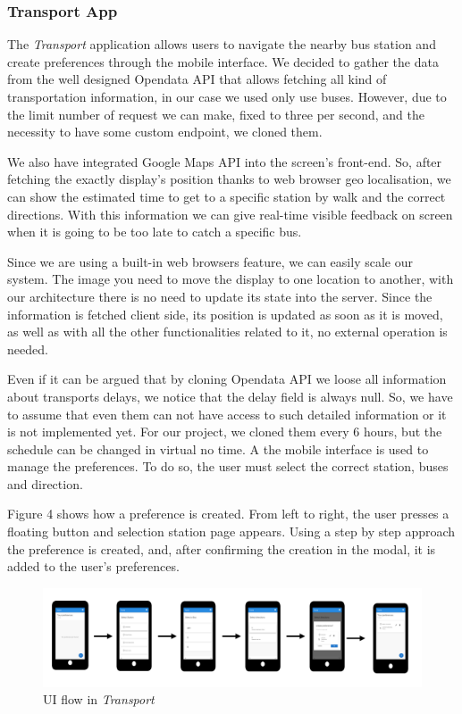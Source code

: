 \documentclass[]{usiinfbachelorproject}
\begin{document}
\subsubsection{Transport App}
The \emph{Transport} application allows users to navigate the nearby bus station and create preferences through the mobile interface. We decided to gather the data from the well designed Opendata API that allows fetching all kind of transportation information, in our case we used only use buses.
However, due to the limit number of request we can make, fixed to three per second, and the necessity to have some custom endpoint, we cloned them.

We also have integrated Google Maps API into the screen's front-end. So, after fetching the exactly display's position thanks to web browser geo localisation, we can show the estimated time to get to a specific station by walk and the correct directions. With this information we can give real-time visible feedback on screen when it is going to be too late to catch a specific bus.

Since we are using a built-in web browsers feature, we can easily scale our system. The image you need to move the display to one location to another, with our architecture there is no need to update its state into the server. Since the information is fetched client side, its position is updated as soon as it is moved, as well as with all the other functionalities related to it,  no external operation is needed.

Even if it can be argued that by cloning Opendata API we loose all information about transports delays, we notice that the delay field is always null. So, we have to assume that even them can not have access to such detailed information or it is not implemented yet. For our project, we cloned them every 6 hours, but the schedule can be changed in virtual no time. A the mobile interface is used to manage the preferences. To do so, the user must select the correct station, buses and direction.

Figure 4 shows how a preference is created. From left to right, the user presses a floating button and selection station page appears. Using a step by step approach the preference is created, and, after confirming the creation in the modal, it is added to the user's preferences.  

\begin{figure}[H]
  \centering
  \includegraphics[width=1\textwidth]{./images/UI_flow_transport.png}
   \caption{UI flow in \emph{Transport}}

\end{figure} 
\end{document}
